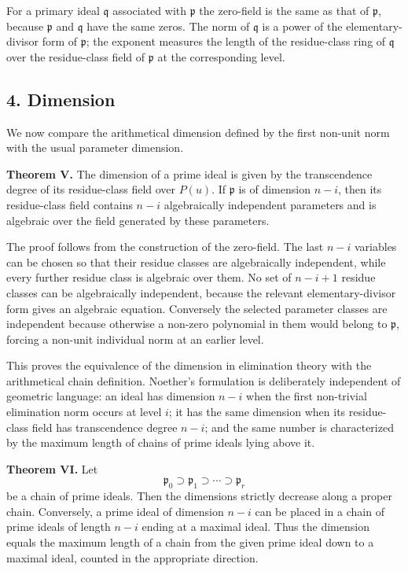 \documentclass[12pt]{article}
\begin{document}
For a primary ideal $\mathfrak q$ associated with $\mathfrak p$ the zero-field is the same as that of $\mathfrak p$, because $\mathfrak p$ and $\mathfrak q$ have the same zeros. The norm of $\mathfrak q$ is a power of the elementary-divisor form of $\mathfrak p$; the exponent measures the length of the residue-class ring of $\mathfrak q$ over the residue-class field of $\mathfrak p$ at the corresponding level.

\subsection{4. Dimension}

We now compare the arithmetical dimension defined by the first non-unit norm with the usual parameter dimension.

\textbf{Theorem V.} The dimension of a prime ideal is given by the transcendence degree of its residue-class field over $P(u)$. If $\mathfrak p$ is of dimension $n-i$, then its residue-class field contains $n-i$ algebraically independent parameters and is algebraic over the field generated by these parameters.

The proof follows from the construction of the zero-field. The last $n-i$ variables can be chosen so that their residue classes are algebraically independent, while every further residue class is algebraic over them. No set of $n-i+1$ residue classes can be algebraically independent, because the relevant elementary-divisor form gives an algebraic equation. Conversely the selected parameter classes are independent because otherwise a non-zero polynomial in them would belong to $\mathfrak p$, forcing a non-unit individual norm at an earlier level.

This proves the equivalence of the dimension in elimination theory with the arithmetical chain definition. Noether's formulation is deliberately independent of geometric language: an ideal has dimension $n-i$ when the first non-trivial elimination norm occurs at level $i$; it has the same dimension when its residue-class field has transcendence degree $n-i$; and the same number is characterized by the maximum length of chains of prime ideals lying above it.

\textbf{Theorem VI.} Let
\[
  \mathfrak p_0\supset \mathfrak p_1\supset\cdots\supset \mathfrak p_r
\]
be a chain of prime ideals. Then the dimensions strictly decrease along a proper chain. Conversely, a prime ideal of dimension $n-i$ can be placed in a chain of prime ideals of length $n-i$ ending at a maximal ideal. Thus the dimension equals the maximum length of a chain from the given prime ideal down to a maximal ideal, counted in the appropriate direction.
\end{document}
